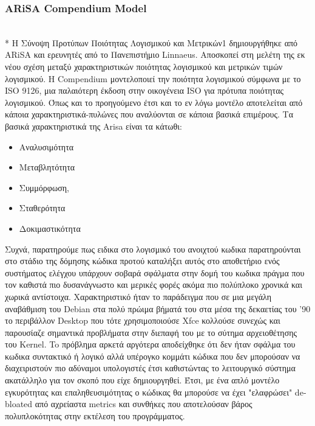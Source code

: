 \documentclass[a4paper, 11pt]{article}
\begin{document}
{{\subsubsection{\textlatin{ARiSA Compendium Model}}\\*
Η Σύνοψη Προτύπων Ποιότητας Λογισμικού και Μετρικών1 δημιουργήθηκε από
\textlatin{ARiSA} και ερευνητές από το Πανεπιστήμιο \textlatin{Linnaeus}. Αποσκοπεί στη μελέτη της εκ νέου
σχέση μεταξύ χαρακτηριστικών ποιότητας λογισμικού και μετρικών τιμών λογισμικού.
Η \textlatin{Compendium} μοντελοποιεί την ποιότητα λογισμικού σύμφωνα με το \textlatin{ISO 9126}, μια παλαιότερη έκδοση στην οικογένεια \textlatin{ISO} για πρότυπα ποιότητας λογισμικού.
Όπως και το προηγούμενο έτσι και το εν λόγω μοντέλο αποτελείται από κάποια χαρακτηριστικά-πυλώνες που αναλύονται σε κάποια βασικά επιμέρους. Tα βασικά χαρακτηριστικά της \textlatin{Arisa} είναι τα κάτωθι:
\begin{itemize}
\item Αναλυσιμότητα
\item Μεταβλητότητα
\item Συμμόρφωση, 
\item Σταθερότητα 
\item Δοκιμαστικότητα
\end{itemize}

Συχνά, παρατηρούμε πως ειδικα στο λογισμικό του ανοιχτού κωδικα παρατηρούνται στο στάδιο της δόμησης κώδικα προτού καταλήξει αυτός στο αποθετήριο ενός συστήματος ελέγχου υπάρχουν σοβαρά σφάλματα στην δομή του κωδικα πράγμα που τον καθιστά πιο δυσανάγνωστο και μερικές φορές ακόμα πιο πολύπλοκο χρονικά και χωρικά αντίστοιχα. Χαρακτηριστικό ήταν το παράδειγμα που σε μια μεγάλη αναβάθμιση του \textlatin{Debian} στα πολύ πρώιμα βήματά του στα μέσα της δεκαετίας του '90 το περιβάλλον \textlatin{Desktop} που τότε χρησιμοποιούσε \textlatin{Xfce} κολλούσε συνεχώς και  παρουσίαζε σημαντικά προβλήματα στην διεπαφή του με το σύτημα αρχειοθέτησης του \textlatin{Kernel}. To πρόβλημα αρκετά αργότερα αποδείχθηκε ότι δεν ήταν σφάλμα του κωδικα συντακτικό ή λογικό αλλά υπέρογκο κομμάτι κώδικα που δεν μπορούσαν να διαχειριστούν πιο αδύναμοι υπολογιστές έτσι καθιστώντας το λειτουργικό σύστημα ακατάλληλο για τον σκοπό που είχε δημιουργηθεί. Έτσι, με ένα απλό μοντέλο εγκυρότητας και επαληθευσιμότητας ο κώδικας θα μπορούσε να έχει "ελαφρώσει" \textlatin{debloated} από αχρείαστα \textlatin{metrics} και συνθήκες που αποτελούσαν βάρος πολυπλοκότητας στην εκτέλεση του προγράμματος.

}}
\end{document}
